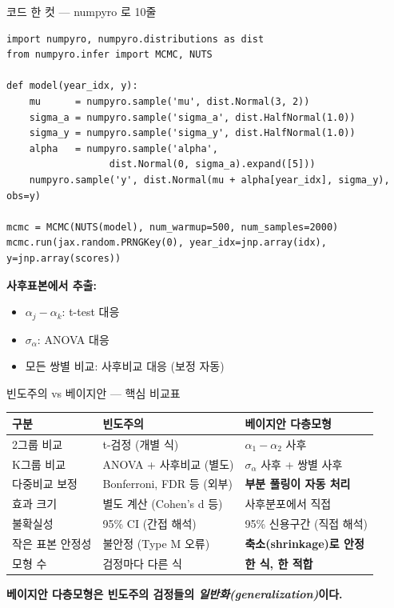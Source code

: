\documentclass[aspectratio=169, 11pt]{beamer}
\begin{document}
\begin{frame}[fragile]{코드 한 컷 — numpyro 로 10줄}
\small
\begin{verbatim}
import numpyro, numpyro.distributions as dist
from numpyro.infer import MCMC, NUTS

def model(year_idx, y):
    mu      = numpyro.sample('mu', dist.Normal(3, 2))
    sigma_a = numpyro.sample('sigma_a', dist.HalfNormal(1.0))
    sigma_y = numpyro.sample('sigma_y', dist.HalfNormal(1.0))
    alpha   = numpyro.sample('alpha',
                  dist.Normal(0, sigma_a).expand([5]))
    numpyro.sample('y', dist.Normal(mu + alpha[year_idx], sigma_y), obs=y)

mcmc = MCMC(NUTS(model), num_warmup=500, num_samples=2000)
mcmc.run(jax.random.PRNGKey(0), year_idx=jnp.array(idx), y=jnp.array(scores))
\end{verbatim}
\normalsize

\textbf{사후표본에서 추출:}
\begin{itemize}
\item $\alpha_j - \alpha_k$: t-test 대응
\item $\sigma_\alpha$: ANOVA 대응
\item 모든 쌍별 비교: 사후비교 대응 (보정 자동)
\end{itemize}
\end{frame}

\begin{frame}{빈도주의 vs 베이지안 — 핵심 비교표}
\centering
\small
\begin{tabular}{lll}
\toprule
구분 & 빈도주의 & 베이지안 다층모형 \\
\midrule
2그룹 비교 & t-검정 (개별 식) & $\alpha_1 - \alpha_2$ 사후 \\
K그룹 비교 & ANOVA + 사후비교 (별도) & $\sigma_\alpha$ 사후 + 쌍별 사후 \\
다중비교 보정 & Bonferroni, FDR 등 (외부) & \textbf{부분 풀링이 자동 처리} \\
효과 크기 & 별도 계산 (Cohen's d 등) & 사후분포에서 직접 \\
불확실성 & 95\% CI (간접 해석) & 95\% 신용구간 (직접 해석) \\
작은 표본 안정성 & 불안정 (Type M 오류) & \textbf{축소(shrinkage)로 안정} \\
모형 수 & 검정마다 다른 식 & \textbf{한 식, 한 적합} \\
\bottomrule
\end{tabular}

\vspace{0.3cm}
\centering
\textbf{베이지안 다층모형은 빈도주의 검정들의 \emph{일반화(generalization)}이다.}
\end{frame}
\end{document}
